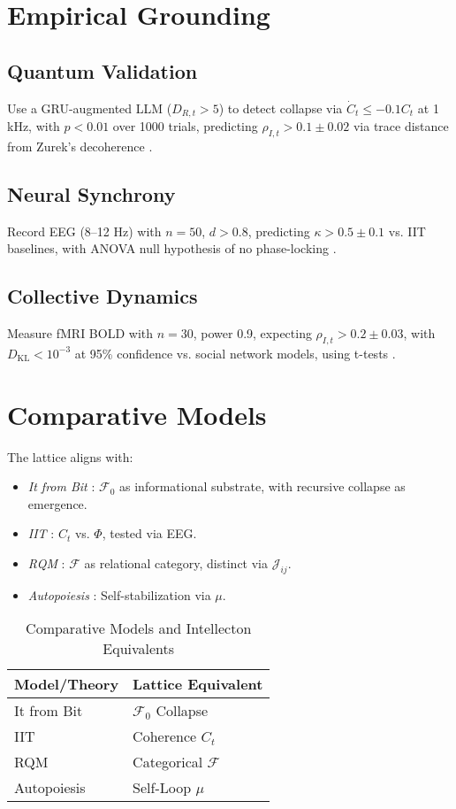 \documentclass[11pt]{article}
\newcommand{\field}[1]{\mathcal{#1}}
\newcommand{\dkl}{D_{\text{KL}}}
\begin{document}
\section{Empirical Grounding}
\label{sec:empirical}

\subsection{Quantum Validation}
Use a GRU-augmented LLM ($D_{R,t} > 5$) to detect collapse via $\dot{C}_t \leq -0.1 C_t$ at 1 kHz, with $p < 0.01$ over 1000 trials, predicting $\rho_{I,t} > 0.1 \pm 0.02$ via trace distance from Zurek’s decoherence \citep{engel2023}.

\subsection{Neural Synchrony}
Record EEG (8--12 Hz) with $n = 50$, $d > 0.8$, predicting $\kappa > 0.5 \pm 0.1$ vs. IIT baselines, with ANOVA null hypothesis of no phase-locking \citep{panksepp1998, tononi2023}.

\subsection{Collective Dynamics}
Measure fMRI BOLD with $n = 30$, power 0.9, expecting $\rho_{I,t} > 0.2 \pm 0.03$, with $\dkl < 10^{-3}$ at 95\% confidence vs. social network models, using t-tests \citep{couzin2023}.

\section{Comparative Models}
\label{sec:comparative}
The lattice aligns with:
\begin{itemize}
    \item \textit{It from Bit} \citep{wheeler1990}: $\field{F}_0$ as informational substrate, with recursive collapse as emergence.
    \item \textit{IIT} \citep{tononi2023}: $C_t$ vs. $\Phi$, tested via EEG.
    \item \textit{RQM} \citep{rovelli2023}: $\field{F}$ as relational category, distinct via $\mathcal{J}_{ij}$.
    \item \textit{Autopoiesis} \citep{varela1974}: Self-stabilization via $\mu$.
\end{itemize}

\begin{table}[h]
\centering
\caption{Comparative Models and Intellecton Equivalents}
\begin{tabular}{ll}
\toprule
Model/Theory & Lattice Equivalent \\
\midrule
It from Bit & $\field{F}_0$ Collapse \\
IIT & Coherence $C_t$ \\
RQM & Categorical $\field{F}$ \\
Autopoiesis & Self-Loop $\mu$ \\
\bottomrule
\end{tabular}
\label{tab:comparative}
\end{table}
\end{document}
